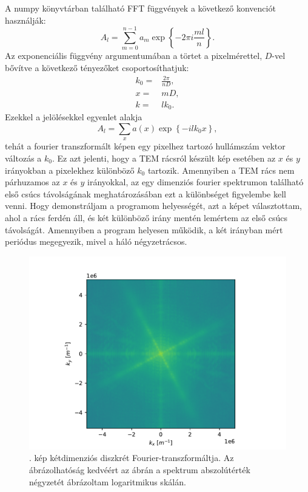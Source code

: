 \documentclass[pdftex,12pt,a4paper]{article}
\newcommand{\aeqref}[1]{\az{\eqref{#1}}}
\begin{document}
		A numpy könyvtárban található FFT függvények a következő konvenciót használják:
		\begin{equation}
			A_l = \sum_{m=0}^{n-1}a_m\exp\left\{-2\pi i\frac{ml}{n}\right\}.
			\label{fftconv}
		\end{equation}
		Az exponenciális függvény argumentumában a törtet a pixelmérettel, $D$-vel bővítve a következő tényezőket csoportosíthatjuk:
		\begin{equation}
			\begin{split}
				k_0 =& \frac{2\pi}{nD},\\
				x   =& mD,\\
				k   =& lk_0.
			\end{split}
		\end{equation}
		Ezekkel a jelölésekkel \aeqref{fftconv} egyenlet alakja
		\begin{equation}
			A_l = \sum_x a(x)\exp\left\{-ilk_0x\right\},
		\end{equation}
		tehát a fourier transzformált képen egy pixelhez tartozó hullámszám vektor változás a $k_0$. Ez azt jelenti, hogy a TEM rácsról készült kép esetében az $x$ és $y$ irányokban a pixelekhez különböző $k_0$ tartozik. Amennyiben a TEM rács nem párhuzamos az $x$ és $y$ irányokkal, az egy dimenziós fourier spektrumon található első csúcs távolságának meghatározásában ezt a különbséget figyelembe kell venni. Hogy demonstráljam a programom helyességét, azt a képet választottam, ahol a rács ferdén áll, és két különböző irány mentén lemértem az első csúcs távolságát. Amennyiben a program helyesen működik, a két irányban mért periódus megegyezik, mivel a háló négyzetrácsos.
		\begin{figure}[H]
			\centering
			\includegraphics[scale=1]{./figs/2dfft.pdf}
			\caption{. kép kétdimenziós diszkrét Fourier-transzformáltja. Az ábrázolhatóság kedvéért az ábrán a spektrum abszolútérték négyzetét ábrázoltam logaritmikus skálán.}
			\label{2dfft}
		\end{figure}
\end{document}
